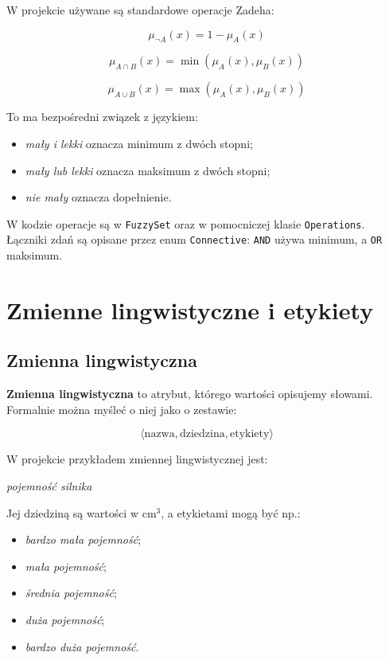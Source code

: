 \documentclass[11pt,a4paper]{article}
\newcommand{\code}[1]{\texttt{#1}}
\newcommand{\term}[1]{\textbf{#1}}
\begin{document}
W projekcie używane są standardowe operacje Zadeha:

\[
\mu_{\neg A}(x)=1-\mu_A(x)
\]

\[
\mu_{A \cap B}(x)=\min(\mu_A(x), \mu_B(x))
\]

\[
\mu_{A \cup B}(x)=\max(\mu_A(x), \mu_B(x))
\]

To ma bezpośredni związek z językiem:

\begin{itemize}
    \item \emph{mały i lekki} oznacza minimum z dwóch stopni;
    \item \emph{mały lub lekki} oznacza maksimum z dwóch stopni;
    \item \emph{nie mały} oznacza dopełnienie.
\end{itemize}

W kodzie operacje są w \code{FuzzySet} oraz w pomocniczej klasie \code{Operations}. Łączniki zdań są opisane przez enum \code{Connective}: \code{AND} używa minimum, a \code{OR} maksimum.

\section{Zmienne lingwistyczne i etykiety}

\subsection{Zmienna lingwistyczna}

\term{Zmienna lingwistyczna} to atrybut, którego wartości opisujemy słowami. Formalnie można myśleć o niej jako o zestawie:

\[
\langle \text{nazwa}, \text{dziedzina}, \text{etykiety} \rangle
\]

W projekcie przykładem zmiennej lingwistycznej jest:

\begin{center}
\emph{pojemność silnika}
\end{center}

Jej dziedziną są wartości w cm\(^3\), a etykietami mogą być np.:

\begin{itemize}
    \item \emph{bardzo mała pojemność};
    \item \emph{mała pojemność};
    \item \emph{średnia pojemność};
    \item \emph{duża pojemność};
    \item \emph{bardzo duża pojemność}.
\end{itemize}
\end{document}
